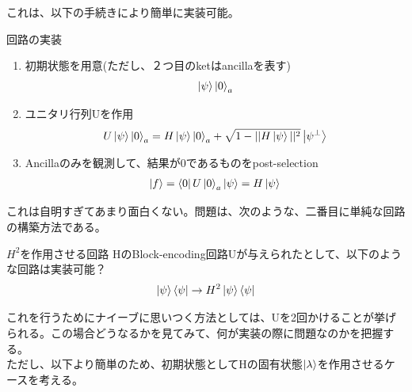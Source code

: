 \documentclass[a4paper,10.5pt]{article}
\numberwithin{equation}{section}
\begin{document}
これは、以下の手続きにより簡単に実装可能。
\begin{setupbox}{回路の実装}
\begin{enumerate}
    \item 初期状態を用意(ただし、２つ目のketはancillaを表す)
    \begin{align*}
        \ket{\psi}\ket{0}_{a}
    \end{align*}
    \item ユニタリ行列Uを作用
    \begin{align*}
        U\ket{\psi}\ket{0}_{a}=H\ket{\psi}\ket{0}_{a}+\sqrt{1-||H\ket{\psi}||^{2}}\ket{\psi^{\perp}}
    \end{align*}
    \item Ancillaのみを観測して、結果が0であるものをpost-selection
    \begin{align*}
        \ket{f}=\bra{0}U\ket{0}_{a}\ket{\psi}=H\ket{\psi}
    \end{align*}
\end{enumerate}
\end{setupbox}
これは自明すぎてあまり面白くない。問題は、次のような、二番目に単純な回路の構築方法である。
\begin{problembox}{$H^{2}$を作用させる回路}
    HのBlock-encoding回路Uが与えられたとして、以下のような回路は実装可能？
\begin{align*}
    \ket{\psi}\bra{\psi}\to H^{2}\ket{\psi}\bra{\psi}
\end{align*}
\end{problembox}
これを行うためにナイーブに思いつく方法としては、Uを2回かけることが挙げられる。この場合どうなるかを見てみて、何が実装の際に問題なのかを把握する。
\\
ただし、以下より簡単のため、初期状態としてHの固有状態$\ket{\lambda}$を作用させるケースを考える。
\end{document}
